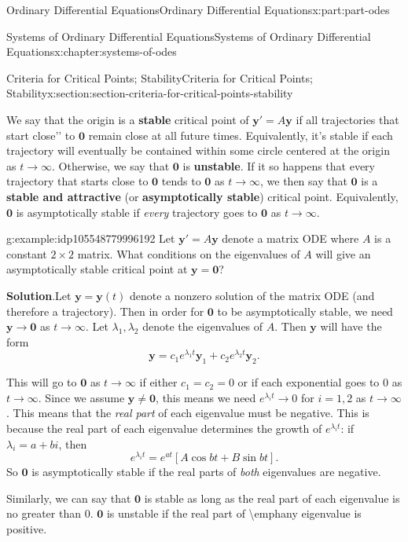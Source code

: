 \documentclass[oneside,10pt,]{book}
\newcommand{\blocktitlefont}{\relax}
\newcommand{\terminology}[1]{\textbf{#1}}
\numberwithin{equation}{part}
\renewcommand{\vec}[1]{\mathbf{#1}}
\begin{document}
\begin{partptx}{Ordinary Differential Equations}{}{Ordinary Differential Equations}{}{}{x:part:part-odes}
\begin{chapterptx}{Systems of Ordinary Differential Equations}{}{Systems of Ordinary Differential Equations}{}{}{x:chapter:systems-of-odes}
\begin{sectionptx}{Criteria for Critical Points; Stability}{}{Criteria for Critical Points; Stability}{}{}{x:section:section-criteria-for-critical-points-stability}
\par
We say that the origin is a \terminology{stable} critical point of \(\vec{y}'=A\vec{y}\) if all trajectories that start \textasciigrave{}\textasciigrave{}close'{}'{} to \(\vec{0}\) remain close at all future times. Equivalently, it's stable if each trajectory will eventually be contained within some circle centered at the origin as \(t\to\infty\). Otherwise, we say that \(\vec{0}\) is \terminology{unstable}. If it so happens that every trajectory that starts close to \(\vec{0}\) tends to \(\vec{0}\) as \(t\to\infty\), we then say that \(\vec{0}\) is a \terminology{stable and attractive} (or \terminology{asymptotically stable}) critical point. Equivalently, \(\vec{0}\) is asymptotically stable if \emph{every} trajectory goes to \(\vec{0}\) as \(t\to\infty\).%
\begin{example}{}{g:example:idp105548779996192}%
Let \(\vec{y}' = A\vec{y}\) denote a matrix ODE where \(A\) is a constant \(2\times2\) matrix. What conditions on the eigenvalues of \(A\) will give an asymptotically stable critical point at \(\vec{y}=\vec{0}\)?%
\par\smallskip%
\noindent\textbf{\blocktitlefont Solution}.\hypertarget{g:solution:idp105548779998624}{}\quad{}Let \(\vec{y} = \vec{y}(t)\) denote a nonzero solution of the matrix ODE (and therefore a trajectory). Then in order for \(\vec{0}\) to be asymptotically stable, we need \(\vec{y}\to\vec{0}\) as \(t\to\infty\). Let \(\lambda_{1},\lambda_{2}\) denote the eigenvalues of \(A\). Then \(\vec{y}\) will have the form%
\begin{equation*}
\vec{y} = c_{1}e^{\lambda_{1}t}\vec{y}_{1}+c_{2}e^{\lambda_{2}t}\vec{y}_{2}.
\end{equation*}
%
\par
This will go to \(\vec{0}\) as \(t\to\infty\) if either \(c_{1}=c_{2}=0\) or if each exponential goes to \(0\) as \(t\to\infty\). Since we assume \(\vec{y}\neq\vec{0}\), this means we need \(e^{\lambda_{i}t}\to0\) for \(i=1,2\) as \(t\to\infty\). This means that the \emph{real part} of each eigenvalue must be negative. This is because the real part of each eigenvalue determines the growth of \(e^{\lambda_{i}t}\): if \(\lambda_{i} = a+bi\), then%
\begin{equation*}
e^{\lambda_{i}t} = e^{at}[A\cos bt+B\sin bt]\text{.}
\end{equation*}
So \(\vec{0}\) is asymptotically stable if the real parts of \emph{both} eigenvalues are negative.%
\end{example}
Similarly, we can say that \(\vec{0}\) is stable as long as the real part of each eigenvalue is no greater than \(0\). \(\vec{0}\) is unstable if the real part of \textbackslash{}emph\textbraceleft{}any\textbraceright{} eigenvalue is positive.%

\end{sectionptx}
\end{chapterptx}
\end{partptx}
\end{document}
